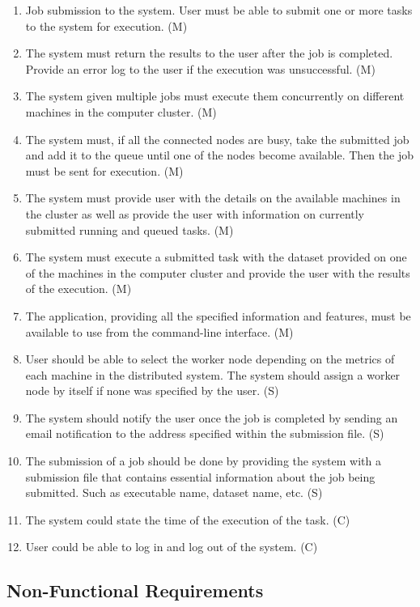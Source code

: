 \documentclass[10pt]{report}
\begin{document}
\begin{enumerate}
    \item Job submission to the system. User must be able to submit one or more tasks to the system for execution. (M)
    \item The system must return the results to the user after the job is completed. Provide an error log to the user if the execution was unsuccessful. (M)
    \item The system given multiple jobs must execute them concurrently on different machines in the computer cluster. (M)
    \item The system must, if all the connected nodes are busy, take the submitted job and add it to the queue until one of the nodes become available. Then the job must be sent for execution. (M)
    \item The system must provide user with the details on the available machines in the cluster as well as provide the user with information on currently submitted running and queued tasks. (M)
    \item The system must execute a submitted task with the dataset provided on one of the machines in the computer cluster and provide the user with the results of the execution. (M)
    \item The application, providing all the specified information and features, must be available to use from the command-line interface. (M)
    \item User should be able to select the worker node depending on the metrics of each machine in the distributed system. The system should assign a worker node by itself if none was specified by the user. (S)
    \item The system should notify the user once the job is completed by sending an email notification to the address specified within the submission file. (S)
    \item The submission of a job should be done by providing the system with a submission file that contains essential information about the job being submitted. Such as executable name, dataset name, etc. (S)
    \item The system could state the time of the execution of the task. (C)
    \item User could be able to log in and log out of the system. (C)

\end{enumerate}

\subsection{Non-Functional Requirements} \label{nonfunc}
\end{document}
